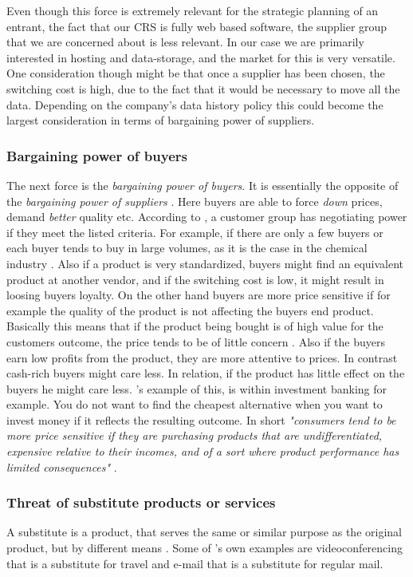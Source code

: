 Even though this force is extremely relevant for the strategic planning of an entrant, the fact that our CRS is fully web based software, the supplier group that we are concerned about is less relevant. In our case we are primarily interested in hosting and data-storage, and the market for this is very versatile. One consideration though might be that once a supplier has been chosen, the switching cost is high, due to the fact that it would be necessary to move all the data. Depending on the company's data history policy this could become the largest consideration in terms of bargaining power of suppliers.

\subsubsection{Bargaining power of buyers}
The next force is the \emph{bargaining power of buyers}. It is essentially the opposite of the \emph{bargaining power of suppliers} \cite[p.~83]{porter2008five}. Here buyers are able to force \emph{down} prices, demand \emph{better} quality etc. According to , a customer group has negotiating power if they meet the listed criteria. For example, if there are only a few buyers or each buyer tends to buy in large volumes, as it is the case in the chemical industry \cite[p.~83]{porter2008five}. Also if a product is very standardized, buyers might find an equivalent product at another vendor, and if the switching cost is low, it might result in loosing buyers loyalty. 
On the other hand buyers are more price sensitive if for example the quality of the product is not affecting the buyers end product. Basically this means that if the product being bought is of high value for the customers outcome, the price tends to be of little concern \cite[p.~84]{porter2008five}. Also if the buyers earn low profits from the product, they are more attentive to prices. In contrast cash-rich buyers might care less. In relation, if the product has little effect on the buyers he might care less. 's example of this, is within investment banking for example. You do not want to find the cheapest alternative when you want to invest money if it reflects the resulting outcome. In short \emph{"consumers tend to be more price sensitive if they are purchasing products that are undifferentiated, expensive relative to their incomes, and of a sort where product performance has limited consequences"} \cite[p.~84]{porter2008five}.

\subsubsection{Threat of substitute products or services}
A substitute is a product, that serves the same or similar purpose as the original product, but by different means \cite[p.~84]{porter2008five}. Some of 's own examples are videoconferencing that is a substitute for travel and e-mail that is a substitute for regular mail. 


